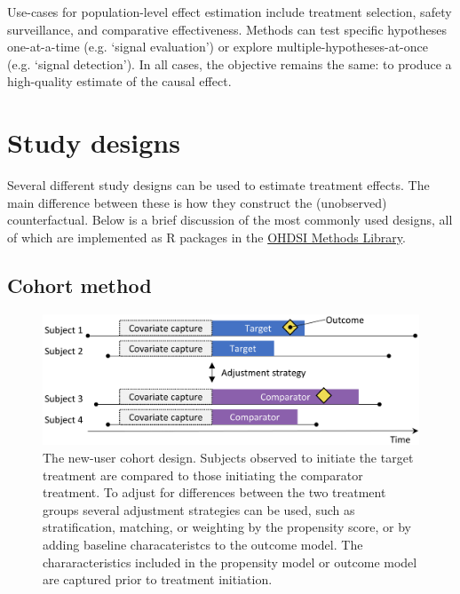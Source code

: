 \documentclass[]{book}
\begin{document}
Use-cases for population-level effect estimation include treatment
selection, safety surveillance, and comparative effectiveness. Methods
can test specific hypotheses one-at-a-time (e.g. `signal evaluation') or
explore multiple-hypotheses-at-once (e.g. `signal detection'). In all
cases, the objective remains the same: to produce a high-quality
estimate of the causal effect.

\section{Study designs}\label{study-designs}

Several different study designs can be used to estimate treatment
effects. The main difference between these is how they construct the
(unobserved) counterfactual. Below is a brief discussion of the most
commonly used designs, all of which are implemented as R packages in the
\href{https://ohdsi.github.io/MethodsLibrary/}{OHDSI Methods Library}.

\subsection{Cohort method}\label{cohort-method}

\begin{figure}

{\centering \includegraphics[width=0.9\linewidth]{images/PopulationLevelEstimation/cohortMethod} 

}

\caption{The new-user cohort design. Subjects observed to initiate the target treatment are compared to those initiating the comparator treatment. To adjust for differences between the two treatment groups several adjustment strategies can be used, such as stratification, matching, or weighting by the propensity score, or by adding baseline characateristcs to the outcome model. The chararacteristics included in the propensity model or outcome model are captured prior to treatment initiation.}\label{fig:cohortMethod}
\end{figure}
\end{document}
